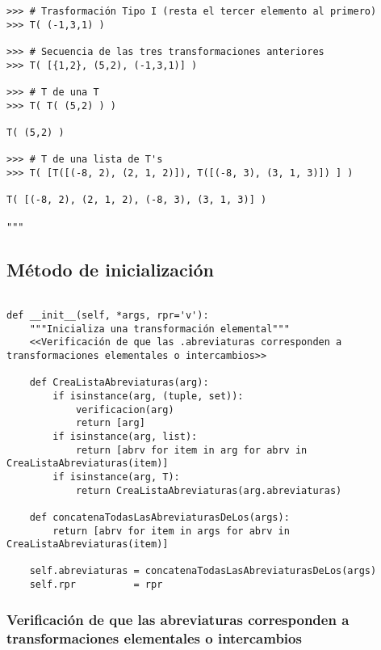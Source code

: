 \documentclass[11pt]{report}
\begin{document}
\begin{verbatim}
>>> # Trasformación Tipo I (resta el tercer elemento al primero)
>>> T( (-1,3,1) )

>>> # Secuencia de las tres transformaciones anteriores
>>> T( [{1,2}, (5,2), (-1,3,1)] )

>>> # T de una T
>>> T( T( (5,2) ) )

T( (5,2) )

>>> # T de una lista de T's
>>> T( [T([(-8, 2), (2, 1, 2)]), T([(-8, 3), (3, 1, 3)]) ] )

T( [(-8, 2), (2, 1, 2), (-8, 3), (3, 1, 3)] )

"""
\end{verbatim}

\subsection{Método de inicialización}
\label{sec:orgc37bc99}

\begin{verbatim}

def __init__(self, *args, rpr='v'):
    """Inicializa una transformación elemental"""
    <<Verificación de que las .abreviaturas corresponden a transformaciones elementales o intercambios>>
    
    def CreaListaAbreviaturas(arg):
        if isinstance(arg, (tuple, set)):
            verificacion(arg)
            return [arg]
        if isinstance(arg, list):
            return [abrv for item in arg for abrv in CreaListaAbreviaturas(item)]
        if isinstance(arg, T):
            return CreaListaAbreviaturas(arg.abreviaturas) 
    
    def concatenaTodasLasAbreviaturasDeLos(args):
        return [abrv for item in args for abrv in CreaListaAbreviaturas(item)]
    
    self.abreviaturas = concatenaTodasLasAbreviaturasDeLos(args)
    self.rpr          = rpr

\end{verbatim}

\subsubsection{Verificación de que las abreviaturas corresponden a transformaciones elementales o intercambios}
\label{sec:orge3acbdb}
\end{document}
